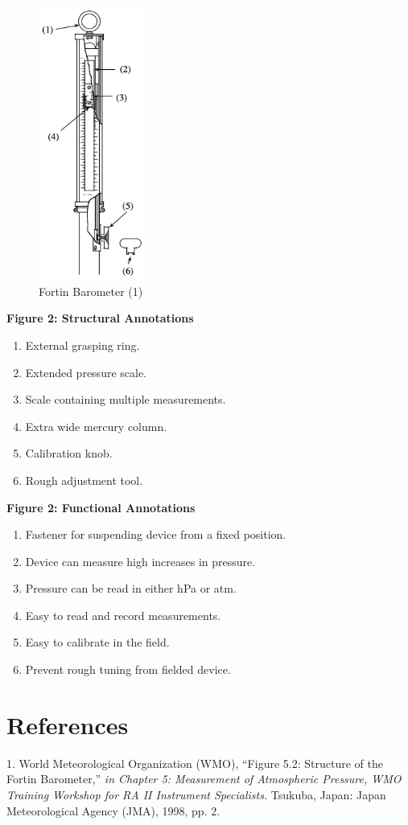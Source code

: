 \documentclass{article}
\begin{document}
\begin{figure}[!ht]
    \centering
    \includegraphics[height=9cm]{fortin.png}
    \caption{Fortin Barometer (1)}
    \label{fig:baro}
\end{figure}
\textbf{Figure 2: Structural Annotations}
\begin{enumerate}[itemsep=-0.5em]
    \item External grasping ring.
    \item Extended pressure scale.
    \item Scale containing multiple measurements.
    \item Extra wide mercury column.
    \item Calibration knob.
    \item Rough adjustment tool.
\end{enumerate}

\textbf{Figure 2: Functional Annotations}
\begin{enumerate}[itemsep=-0.5em]
    \item Fastener for suspending device from a fixed position.
    \item Device can measure high increases in pressure.
    \item Pressure can be read in either hPa or atm.
    \item Easy to read and record measurements.
    \item Easy to calibrate in the field.
    \item Prevent rough tuning from fielded device.
\end{enumerate}

\newpage
\section*{References}

1. World Meteorological Organization (WMO), “Figure 5.2: Structure of the Fortin Barometer,” \textit{in Chapter 5: Measurement of Atmospheric Pressure, WMO Training Workshop for RA II Instrument Specialists.} Tsukuba, Japan: Japan Meteorological Agency (JMA), 1998, pp. 2. 
\end{document}
